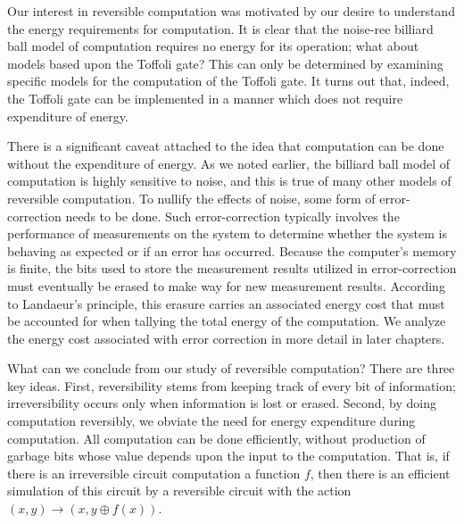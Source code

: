 Our interest in reversible computation was motivated by our desire to understand the energy requirements for computation. It is clear that the noise-ree billiard ball model of computation requires no energy for its operation; what about models based upon the Toffoli gate? This can only be determined by examining specific models for the computation of the Toffoli gate. It turns out that, indeed, the Toffoli gate can be implemented in a manner which does not require expenditure of energy.

There is a significant caveat attached to the idea that computation can be done without the expenditure of energy. As we noted earlier, the billiard ball model of computation is highly sensitive to noise, and this is true of many other models of reversible computation. To nullify the effects of noise, some form of error-correction needs to be done. Such error-correction typically involves the performance of measurements on the system to determine whether the system is behaving as expected or if an error has occurred. Because the computer's memory is finite, the bits used to store the measurement results utilized in error-correction must eventually be erased to make way for new measurement results. According to Landaeur's principle, this erasure carries an associated energy cost that must be accounted for when tallying the total energy of the computation. We analyze the energy cost associated with error correction in more detail in later chapters.

What can we conclude from our study of reversible computation? There are three key ideas. First, reversibility stems from keeping track of every bit of information; irreversibility occurs only when information is lost or erased. Second, by doing computation reversibly, we obviate the need for energy expenditure during computation. All computation can be done efficiently, without production of garbage bits whose value depends upon the input to the computation. That is, if there is an irreversible circuit computation a function $f$, then there is an efficient simulation of this circuit by a reversible circuit with the action $(x,y)\rightarrow (x,y\oplus f(x))$.

